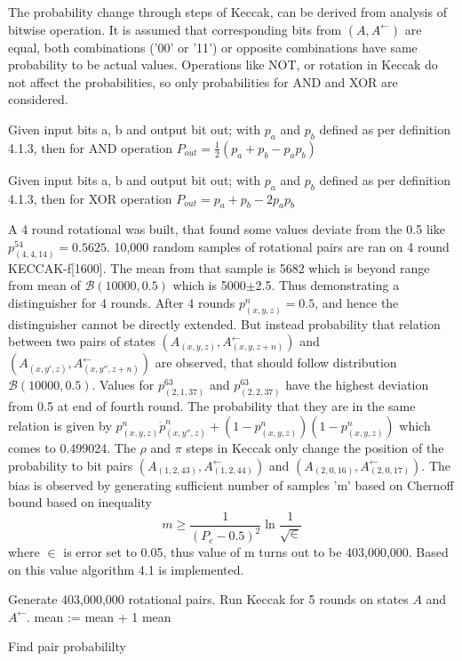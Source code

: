 The probability change through steps of Keccak, can be derived from analysis of bitwise operation. It is assumed
that corresponding bits from $(A, A^{\leftarrow})$ are equal, both combinations ('00' or '11') or opposite combinations
have same probability to be actual values. Operations like NOT, or rotation in Keccak do not affect the probabilities,
so only probabilities for AND and XOR are considered.

\begin{lem}
Given input bits a, b and output bit out; with $p_a$ and $p_b$ defined as per definition 4.1.3, then for AND operation
$P_{out} = \frac{1}{2}(p_{a} + p_{b} - p_{a} p_{b})$ \cite{00022}
\end{lem}

\begin{lem}
Given input bits a, b and output bit out; with $p_a$ and $p_b$ defined as per definition 4.1.3, then for XOR operation
$P_{out} = p_{a} + p_{b} - 2 p_{a} p_{b}$ \cite{00022}
\end{lem}

A 4 round rotational was built, that found some values deviate from the 0.5 like $p^{54}_{(4, 4, 14)} = 0.5625$. 10,000
random samples of rotational pairs are ran on 4 round KECCAK-f[1600]. The mean from that sample is 5682 which is beyond
range from mean of $\mathcal{B}(10000, 0.5)$ which is 5000$\pm$2.5. Thus demonstrating a distinguisher for 4 rounds.
After 4 rounds $p^n_{(x, y, z)} = 0.5$, and hence the distinguisher cannot be directly extended. But instead probability
that relation between two pairs of states $(A_{(x, y, z)}, A^{\leftarrow}_{(x, y, z+n)})$ and 
$(A_{(x, y', z)}, A^{\leftarrow}_{(x, y'', z+n)})$ are observed, that should follow distribution $\mathcal{B}(10000, 0.5)$.
Values for $p^{63}_{(2, 1, 37)}$ and $p^{63}_{(2, 2, 37)}$ have the highest deviation from 0.5 at end of fourth round. The
probability that they are in the same relation is given by $p^n_{(x, y, z)} \dot p^n_{(x, y'', z)} + (1 - p^n_{(x, y, z)})
(1 - p^n_{(x, y, z)})$ which comes to 0.499024. The $\rho$ and $\pi$ steps in Keccak only change the position of the
probability to bit pairs $(A_{(1, 2, 43)}, A^{\leftarrow}_{(1, 2, 44)})$ and $(A_{(2, 0, 16)}, A^{\leftarrow}_{(2, 0, 17)})$.
The bias is observed by generating sufficient number of samples 'm' based on Chernoff bound based on inequality 
\[ m \geq \frac{1}{(P_c - 0.5)^2} \ln \frac{1}{\sqrt \in}\]
where $\in$ is error set to 0.05, thus value of m turns out to be 403,000,000. Based on this value algorithm 4.1 is implemented.
  \begin{algorithm}
  \begin{algorithmic}[1]
    \State Generate 403,000,000 rotational pairs.
      \State Run Keccak for 5 rounds on states $A$ and $A^{\leftarrow}$.
      \State mean := mean + 1
      \EndIf
    \EndFor
    \State \Return mean
  \end{algorithmic}
  \caption[Find pair probabililty]{Find pair probabililty \cite{00022}}
  \label{alg:seq}
  \end{algorithm}

